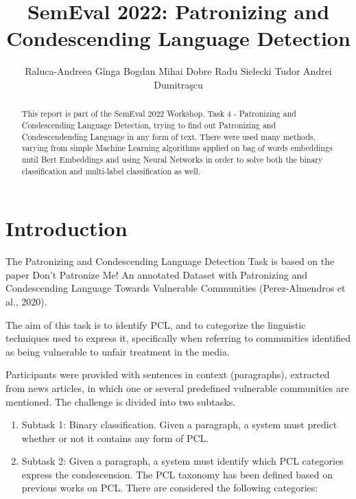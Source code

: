 \documentclass[11pt]{article}
\begin{document}
\title{SemEval 2022: Patronizing and Condescending Language Detection}
\author{Raluca-Andreea G\^inga \And Bogdan Mihai Dobre \And Radu Sielecki \And Tudor Andrei Dumitra\c{s}cu
}
\date{}
\maketitle

\begin{abstract}
This report is part of the SemEval 2022 Workshop, Task 4 - Patronizing and
Condescending Language Detection, trying to find out Patronizing and
Condescendending Language in any form of text. There were used many methods,
varying from simple Machine Learning algorithms applied on bag of words
embeddings until Bert Embeddings and using Neural Networks in order to solve
both the binary classification and multi-label classification as well.
\end{abstract}

\section{Introduction}

The Patronizing and Condescending Language Detection Task is based on the
paper Don't Patronize Me! An annotated Dataset with Patronizing and
Condescending Language Towards Vulnerable Communities (Perez-Almendros et
al., 2020).

The aim of this task is to identify PCL, and to categorize the linguistic
techniques used to express it, specifically when referring to communities
identified as being vulnerable to unfair treatment in the media.

Participants were provided with sentences in context (paragraphs), extracted
from news articles, in which one or several predefined vulnerable
communities are mentioned. The challenge is divided into two subtasks.

\begin{enumerate}
\item Subtask 1: Binary classification. Given a paragraph, a system must
predict whether or not it contains any form of PCL.

\item Subtask 2: Given a paragraph, a system must identify which PCL
categories express the condescension. The PCL taxonomy has been defined
based on previous works on PCL. There are considered the following
categories:
\end{enumerate}
\end{document}
